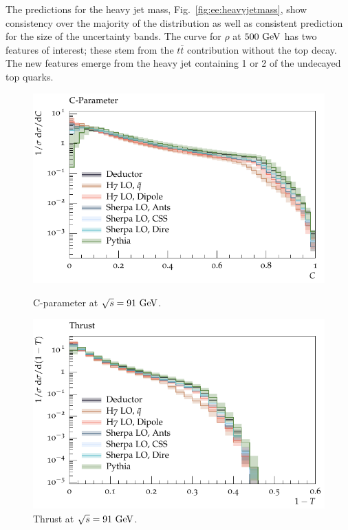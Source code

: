 The predictions for the heavy jet mass, Fig.~\ref{fig:ee:heavyjetmass}, show consistency over the majority of the distribution as well as consistent prediction for the size of the uncertainty bands. 
The \Deductor curve for $\rho$ at $500~\textrm{GeV}$ has two features of interest; these stem from the $t\bar{t}$ contribution without the top decay. The new features emerge from the heavy jet containing 1 or 2 of the undecayed top quarks.

\begin{figure}[h]
  \centering
  \begin{minipage}[t]{0.49\textwidth}
    \includegraphics[width=1\textwidth]{plots/EE-91-MuShower/MC_EETOJETS/CParameter.pdf}
    \caption{C-parameter at $\sqrt{s}=91~\textrm{GeV}$.}
    \label{fig:ee:cparam:91}
  \end{minipage}
  \begin{minipage}[t]{0.49\textwidth}
    \includegraphics[width=1\textwidth]{plots/EE-91-MuShower/MC_EETOJETS/Thrust.pdf}
    \caption{Thrust at $\sqrt{s}=91~\textrm{GeV}$.}
	\label{fig:ee:thrust:91}
  \end{minipage}
\end{figure}

